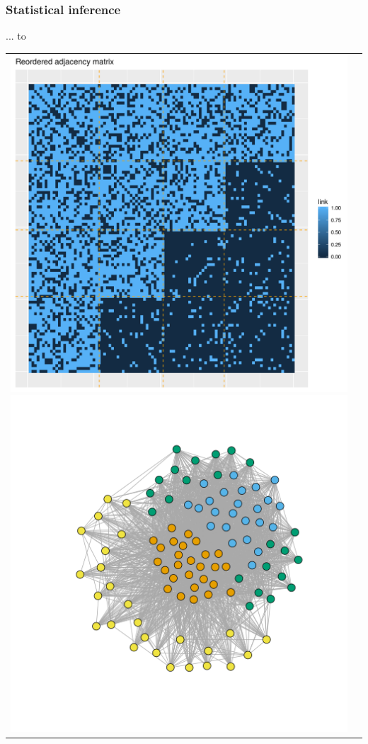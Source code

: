 \documentclass[compress,10pt]{beamer}
\begin{document}
\begin{frame}\frametitle{Statistical inference} 

... to 

\centering
\begin{tabular}{cc}
\includegraphics[scale=.2]{plots/sbm/Nested_reordered_adja_with_groups.png}
\includegraphics[scale=.2]{plots/sbm/Nested_graphe_with_colors.png}
\end{tabular}


\end{frame}
\end{document}
